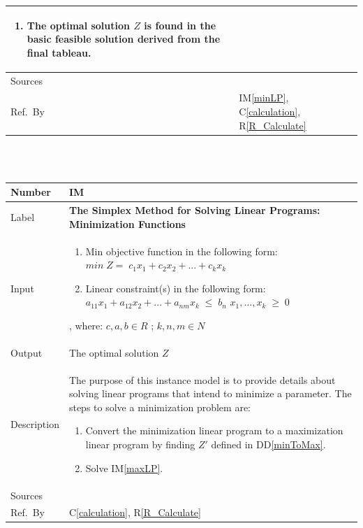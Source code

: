 \documentclass[12pt]{article}
\newcommand{\colAwidth}{0.13\textwidth}
\newcommand{\colBwidth}{0.82\textwidth}
\newcommand{\ddref}[1]{DD\ref{#1}}
\newcommand{\calcref}[1]{C\ref{#1}}
\newcounter{instnum} %
\newcommand{\iref}[1]{IM\ref{#1}}
\newcommand{\rref}[1]{R\ref{#1}}
\begin{document}
\begin{minipage}{\textwidth}
\begin{tabular}{| p{\colAwidth} | p{\colBwidth}|}
\begin{enumerate}
			\item The optimal solution $Z$ is found in the basic feasible 
			solution derived from the final tableau.
		\end{enumerate}
		\\
		\hline
		Sources& \cite{lp-defs}\\
		\hline
		Ref.\ By & \iref{minLP}, \calcref{calculation}, \rref{R_Calculate}\\
		\hline
	\end{tabular}
\end{minipage}\\

~\newline

\noindent
\begin{minipage}{\textwidth}
	\renewcommand*{\arraystretch}{1.5}
	\begin{tabular}{| p{\colAwidth} | p{\colBwidth}|}
		\hline
		\rowcolor[gray]{0.9}
		Number& IM{instnum}\theinstnum \label{minLP}\\
		\hline
		Label& \bf The Simplex Method for Solving Linear Programs: Minimization 
		Functions\\
		\hline
		Input& 
		\begin{enumerate}
			\item Min objective function in the following form: 
			\newline$min\;Z=\;c_{1}x_1 + c_{2}x_2 + ... + c_{k}x_k$
			
			\item Linear constraint(s) in the following form: 
			\newline$a_{11}x_1 + a_{12}x_2 + ... + a_{nm}x_k\;{\leq}\;b_n$
			\newline$x_1, ..., x_k\;{\geq}\;0$
		\end{enumerate} , where: $c, a, b \in R$ ; $k, n, m \in N$\\
		\hline
		Output& The optimal solution $Z$\\
		\hline
		Description& The purpose of this instance model is to provide details 
		about solving linear programs that intend to minimize a parameter. The 
		steps to solve a minimization problem are:
		\begin{enumerate}
			\item Convert the minimization linear program to a maximization 
			linear program by finding $Z'$ defined in \ddref{minToMax}.
			
			\item Solve \iref{maxLP}.
		\end{enumerate}
		\\
		\hline
		Sources& \cite{lp-defs}\\
		\hline
		Ref.\ By & \calcref{calculation}, \rref{R_Calculate} \\
		\hline
	\end{tabular}
\end{minipage}\\
\end{document}
